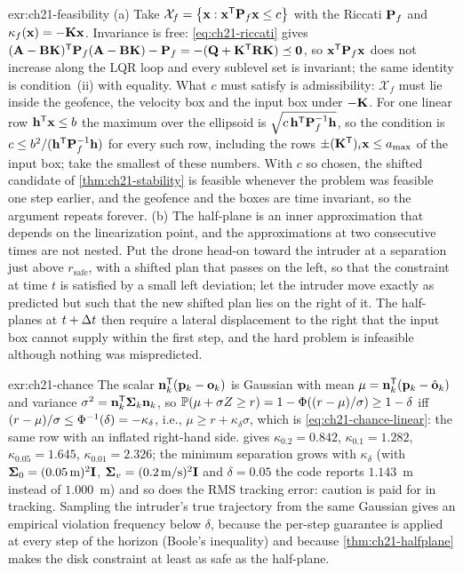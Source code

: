 \begin{solution}{exr:ch21-feasibility}
(a) Take $\mathcal{X}_f=\left\{ \mathbf{x}:\mathbf{x}^{\mathsf{T}}\mathbf{P}_f\mathbf{x}\le c \right\}$ with the Riccati $\mathbf{P}_f$ and $\kappa_f(\mathbf{x})=-\mathbf{K}\mathbf{x}$. Invariance is free: \cref{eq:ch21-riccati} gives $(\mathbf{A}-\mathbf{B}\mathbf{K})^{\mathsf{T}}\mathbf{P}_f(\mathbf{A}-\mathbf{B}\mathbf{K})-\mathbf{P}_f=-(\mathbf{Q}+\mathbf{K}^{\mathsf{T}}\mathbf{R}\mathbf{K})\preceq\mathbf{0}$, so $\mathbf{x}^{\mathsf{T}}\mathbf{P}_f\mathbf{x}$ does not increase along the LQR loop and every sublevel set is invariant; the same identity is condition~(ii) with equality. What $c$ must satisfy is admissibility: $\mathcal{X}_f$ must lie inside the geofence, the velocity box and the input box under $-\mathbf{K}$. For one linear row $\mathbf{h}^{\mathsf{T}}\mathbf{x}\le b$ the maximum over the ellipsoid is $\sqrt{c\,\mathbf{h}^{\mathsf{T}}\mathbf{P}_f^{-1}\mathbf{h}}$, so the condition is $c\le b^2/(\mathbf{h}^{\mathsf{T}}\mathbf{P}_f^{-1}\mathbf{h})$ for every such row, including the rows $\pm(\mathbf{K}^{\mathsf{T}})_i\mathbf{x}\le a_{\max}$ of the input box; take the smallest of these numbers. With $c$ so chosen, the shifted candidate of \cref{thm:ch21-stability} is feasible whenever the problem was feasible one step earlier, and the geofence and the boxes are time invariant, so the argument repeats forever. (b) The half-plane is an inner approximation that depends on the linearization point, and the approximations at two consecutive times are not nested. Put the drone head-on toward the intruder at a separation just above $r_{\mathrm{safe}}$, with a shifted plan that passes on the left, so that the constraint at time $t$ is satisfied by a small left deviation; let the intruder move exactly as predicted but such that the new shifted plan lies on the right of it. The half-planes at $t+\Delta t$ then require a lateral displacement to the right that the input box cannot supply within the first step, and the hard problem is infeasible although nothing was mispredicted.
\end{solution}
\begin{solution}{exr:ch21-chance}
The scalar $\mathbf{n}_k^{\mathsf{T}}(\mathbf{p}_k-\mathbf{o}_k)$ is Gaussian with mean $\mu=\mathbf{n}_k^{\mathsf{T}}(\mathbf{p}_k-\hat{\mathbf{o}}_k)$ and variance $\sigma^2=\mathbf{n}_k^{\mathsf{T}}\mathbf{\Sigma}_k\mathbf{n}_k$, so $\mathbb{P}(\mu+\sigma Z\ge r)=1-\Phi((r-\mu)/\sigma)\ge1-\delta$ iff $(r-\mu)/\sigma\le\Phi^{-1}(\delta)=-\kappa_\delta$, i.e., $\mu\ge r+\kappa_\delta\sigma$, which is \cref{eq:ch21-chance-linear}: the same row with an inflated right-hand side.  gives $\kappa_{0.2}=0.842$, $\kappa_{0.1}=1.282$, $\kappa_{0.05}=1.645$, $\kappa_{0.01}=2.326$; the minimum separation grows with $\kappa_\delta$ (with $\mathbf{\Sigma}_0=(0.05\,\text{m})^2\mathbf{I}$, $\mathbf{\Sigma}_v=(0.2\,\text{m/s})^2\mathbf{I}$ and $\delta=0.05$ the code reports $1.143$~m instead of $1.000$~m) and so does the RMS tracking error: caution is paid for in tracking. Sampling the intruder's true trajectory from the same Gaussian gives an empirical violation frequency below $\delta$, because the per-step guarantee is applied at every step of the horizon (Boole's inequality) and because \cref{thm:ch21-halfplane} makes the disk constraint at least as safe as the half-plane.
\end{solution}

